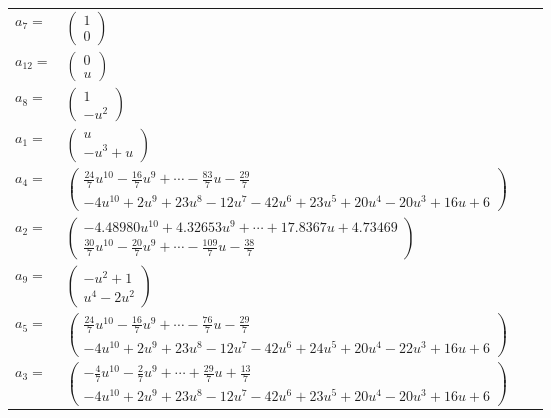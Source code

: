 \documentclass[1p]{elsarticle_modified}
\theoremstyle{definition}
\begin{document}
\begin{tabular}{m{7pt} m{180pt} m{7pt} m{180pt} }
\flushright $a_{7}=$&$\begin{pmatrix}1\\0\end{pmatrix}$ \\
\flushright $a_{12}=$&$\begin{pmatrix}0\\u\end{pmatrix}$ \\
\flushright $a_{8}=$&$\begin{pmatrix}1\\- u^2\end{pmatrix}$ \\
\flushright $a_{1}=$&$\begin{pmatrix}u\\- u^3+u\end{pmatrix}$ \\
\flushright $a_{4}=$&$\begin{pmatrix}\frac{24}{7} u^{10}-\frac{16}{7} u^9+\cdots-\frac{83}{7} u-\frac{29}{7}\\-4 u^{10}+2 u^9+23 u^8-12 u^7-42 u^6+23 u^5+20 u^4-20 u^3+16 u+6\end{pmatrix}$ \\
\flushright $a_{2}=$&$\begin{pmatrix}-4.48980 u^{10}+4.32653 u^{9}+\cdots+17.8367 u+4.73469\\\frac{30}{7} u^{10}-\frac{20}{7} u^9+\cdots-\frac{109}{7} u-\frac{38}{7}\end{pmatrix}$ \\
\flushright $a_{9}=$&$\begin{pmatrix}- u^2+1\\u^4-2 u^2\end{pmatrix}$ \\
\flushright $a_{5}=$&$\begin{pmatrix}\frac{24}{7} u^{10}-\frac{16}{7} u^9+\cdots-\frac{76}{7} u-\frac{29}{7}\\-4 u^{10}+2 u^9+23 u^8-12 u^7-42 u^6+24 u^5+20 u^4-22 u^3+16 u+6\end{pmatrix}$ \\
\flushright $a_{3}=$&$\begin{pmatrix}-\frac{4}{7} u^{10}-\frac{2}{7} u^9+\cdots+\frac{29}{7} u+\frac{13}{7}\\-4 u^{10}+2 u^9+23 u^8-12 u^7-42 u^6+23 u^5+20 u^4-20 u^3+16 u+6\end{pmatrix}$ \\

\end{tabular}
\end{document}
